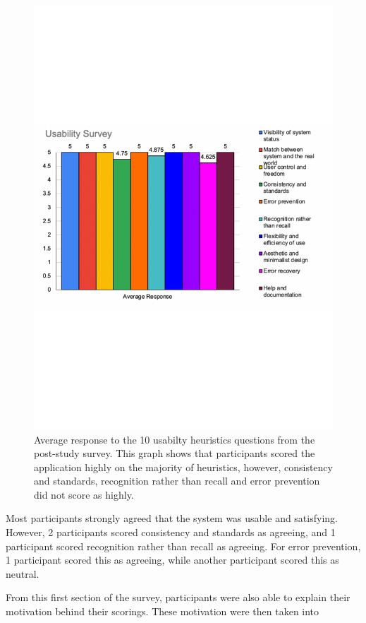 \documentclass{l4proj}
\begin{document}
\begin{figure}
    \centering
    \includegraphics[width=1.0\linewidth]{images/HeuristicsSurvey.pdf}    

    \caption{Average response to the 10 usabilty heuristics questions from the post-study survey. This graph
    shows that participants scored the application highly on the majority of heuristics, however, consistency 
    and standards, recognition rather than recall and error prevention did not score as highly.
    }

    \label{fig:heuristicsSurvey} 
\end{figure}
\par 

Most participants strongly agreed that the system was usable and satisfying. However, 2 participants scored consistency and 
standards as agreeing, and 1 participant scored recognition rather than recall as agreeing. For error prevention, 1
participant scored this as agreeing, while another participant scored this as neutral. 
\par 
From this first section of the survey, participants were also able to explain their motivation behind their scorings. 
These motivation were then taken into 
\end{document}
